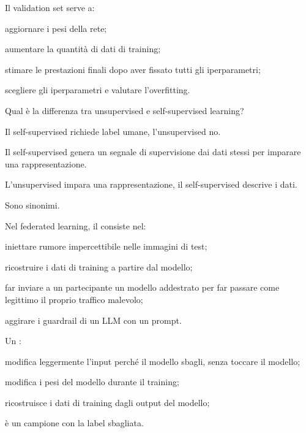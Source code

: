 \begin{domanda}[terminologia]\label{quiz:m3}
Il validation set serve a:
\begin{opzioni}
  \item aggiornare i pesi della rete;
  \item aumentare la quantità di dati di training;
  \item stimare le prestazioni finali dopo aver fissato tutti gli iperparametri;
  \item scegliere gli iperparametri e valutare l'overfitting.
\end{opzioni}
\end{domanda}

\begin{domanda}[paradigmi]\label{quiz:m4}
Qual è la differenza tra unsupervised e self-supervised learning?
\begin{opzioni}
  \item Il self-supervised richiede label umane, l'unsupervised no.
  \item Il self-supervised genera un segnale di supervisione dai dati stessi per imparare una rappresentazione.
  \item L'unsupervised impara una rappresentazione, il self-supervised descrive i dati.
  \item Sono sinonimi.
\end{opzioni}
\end{domanda}

\begin{domanda}\label{quiz:m5}
Nel federated learning, il  consiste nel:
\begin{opzioni}
  \item iniettare rumore impercettibile nelle immagini di test;
  \item ricostruire i dati di training a partire dal modello;
  \item far inviare a un partecipante un modello addestrato per far passare come legittimo il proprio traffico malevolo;
  \item aggirare i guardrail di un LLM con un prompt.
\end{opzioni}
\end{domanda}

\begin{domanda}[adversarial ML]\label{quiz:m6}
Un :
\begin{opzioni}
  \item modifica leggermente l'input perché il modello sbagli, senza toccare il modello;
  \item modifica i pesi del modello durante il training;
  \item ricostruisce i dati di training dagli output del modello;
  \item è un campione con la label sbagliata.
\end{opzioni}
\end{domanda}


